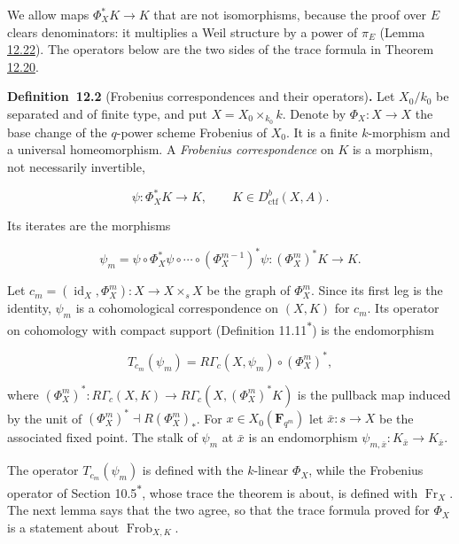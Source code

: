 \documentclass[11pt]{article}
\newenvironment{bpstatement}[2]{\par\addvspace{0.6\baselineskip}\noindent\textbf{#1}#2\textbf{.}\enspace\ignorespaces}
  {\par\addvspace{0.4\baselineskip}}
\newcommand{\bpout}[1]{#1\textsuperscript{\hyperlink{bp-outside}{\ensuremath{\ast}}}}
\begin{document}
We allow maps \(\Phi_X^*K\to K\) that are not isomorphisms, because the proof over \(E\) clears denominators: it multiplies a Weil structure by a power of \(\pi_E\) (Lemma \hyperref[bp69]{12.22}). The operators below are the two sides of the trace formula in Theorem \hyperref[bp62]{12.20}.

\label{bp7}%
\begin{bpstatement}{Definition~12.2}{ (Frobenius correspondences and their operators)}
Let \(X_0/k_0\) be separated and of finite type, and put \(X=X_0\times_{k_0}k\). Denote by \(\Phi_X:X\to X\) the base change of the \(q\)-power scheme Frobenius of \(X_0\). It is a finite \(k\)-morphism and a universal homeomorphism. A \emph{Frobenius correspondence} on \(K\) is a morphism, not necessarily invertible,

\[
\psi:\Phi_X^*K\longrightarrow K,
\qquad K\in D^b_{\mathrm{ctf}}(X,A).
\]

Its iterates are the morphisms

\[
\psi_m=\psi\circ\Phi_X^*\psi\circ\cdots\circ
(\Phi_X^{m-1})^*\psi:(\Phi_X^m)^*K\longrightarrow K.
\]

Let \(c_m=(\operatorname{id}_X,\Phi_X^m):X\to X\times_sX\) be the graph of \(\Phi_X^m\). Since its first leg is the identity, \(\psi_m\) is a cohomological correspondence on \((X,K)\) for \(c_m\). Its operator on cohomology with compact support (Definition \bpout{11.11}) is the endomorphism

\[
T_{c_m}(\psi_m)
=R\Gamma_c(X,\psi_m)\circ(\Phi_X^m)^*,
\]

where \((\Phi_X^m)^*:R\Gamma_c(X,K)\to R\Gamma_c(X,(\Phi_X^m)^*K)\) is the pullback map induced by the unit of \((\Phi_X^m)^*\dashv R(\Phi_X^m)_*\). For \(x\in X_0(\mathbf F_{q^m})\) let \(\bar x:s\to X\) be the associated fixed point. The stalk of \(\psi_m\) at \(\bar x\) is an endomorphism \(\psi_{m,\bar x}:K_{\bar x}\to K_{\bar x}\).
\end{bpstatement}

\label{bp8}%
The operator \(T_{c_m}(\psi_m)\) is defined with the \(k\)-linear \(\Phi_X\), while the Frobenius operator of Section \bpout{10.5}, whose trace the theorem is about, is defined with \(\operatorname{Fr}_X\). The next lemma says that the two agree, so that the trace formula proved for \(\Phi_X\) is a statement about \(\operatorname{Frob}_{X,K}\).
\end{document}
